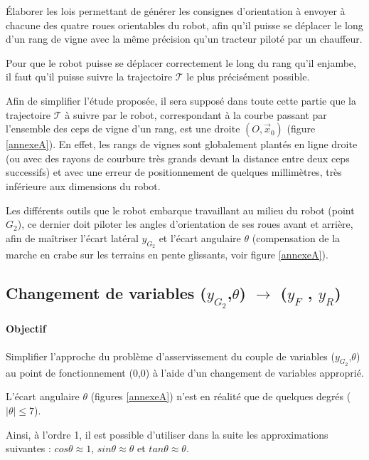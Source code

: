 Élaborer les lois permettant de générer les consignes d'orientation à envoyer à chacune des quatre roues orientables du robot, afin qu'il puisse se déplacer le long d'un rang de vigne avec la même précision qu'un tracteur piloté par un chauffeur.

Pour que le robot puisse se déplacer correctement le long du rang qu'il enjambe, il faut qu'il puisse suivre la trajectoire $\mathcal{T}$ le plus précisément possible.

Afin de simplifier l'étude proposée, il sera supposé dans toute cette partie que la trajectoire $\mathcal{T}$ à suivre par le robot, correspondant à la courbe passant par l'ensemble des ceps de vigne d'un rang, est une droite $(O,\vec{x}_0)$ (figure \ref{annexeA}). En effet, les rangs de vignes sont globalement plantés en ligne droite (ou avec des rayons de courbure très grands devant la distance entre deux ceps successifs) et avec une erreur de positionnement de quelques millimètres, très inférieure aux dimensions du robot.

Les différents outils que le robot embarque travaillant au milieu du robot (point $G_2$), ce dernier doit piloter les angles d'orientation de ses roues avant et arrière, afin de maîtriser l'écart latéral $y_{G_2}$ et l'écart angulaire $\theta$ (compensation de la marche en crabe sur les terrains en pente glissants, voir figure \ref{annexeA}).

\subsection{Changement de variables ($y_{G_2}$,$\theta$) $\rightarrow$ ($y_F$ , $y_R$)}

\paragraph{Objectif}

Simplifier l'approche du problème d'asservissement du couple de variables ($y_{G_2}$,$\theta$) au point de fonctionnement ($0$,$0$) à l'aide d'un changement de variables approprié.

L'écart angulaire $\theta$ (figures \ref{annexeA}) n'est en réalité que de quelques degrés ($|\theta|\leq 7$\textdegree).

Ainsi, à l'ordre 1, il est possible d'utiliser dans la suite les approximations suivantes :
$cos \theta \approx 1$,
$sin \theta \approx \theta$
et $tan \theta \approx \theta$.


